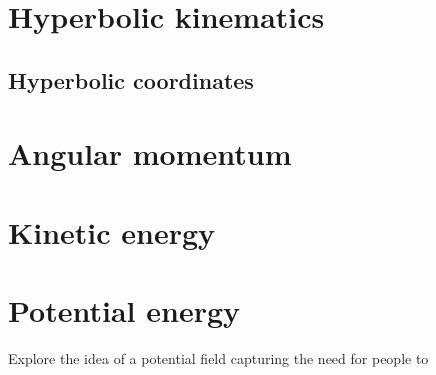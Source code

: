 \section{Hyperbolic kinematics}
\subsection{Hyperbolic coordinates}

\section{Angular momentum}

\section{Kinetic energy}

\section{Potential energy}
Explore the idea of a potential field capturing the need for people to 
